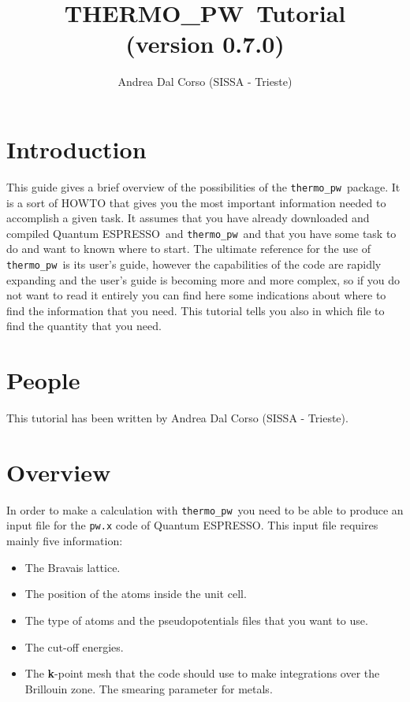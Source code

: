 \documentclass[12pt,a4paper]{article}
\def\version{0.7.0}
\def\qe{{\sc Quantum ESPRESSO}}
\def\tpw{{\sc THERMO\_PW}}
\def\thermo{\texttt{thermo\_pw}}
\begin{document}
 
\author{Andrea Dal Corso (SISSA - Trieste)}
\date{}


\title{
  \vskip 1cm
  {\color{red} \Huge \tpw\ Tutorial} \\
  \Large (version \version)
}

\maketitle

\tableofcontents

\newpage

\section{\color{coral}Introduction}

This guide gives a brief overview of the possibilities of the \thermo\ package. 
It is a sort of HOWTO that gives you the most important information needed 
to accomplish a given task.
It assumes that you have already downloaded and compiled \qe\ and \thermo\  
and that you have some task to do and want to known where to start. 
The ultimate reference for the use of \thermo\ is its user's guide,
however the capabilities of the code are rapidly expanding and the 
user's guide is becoming more and more complex, so if you do not want
to read it entirely you can find here some indications about where
to find the information that you need.
This tutorial tells you also in which file to find the quantity that you need.

\section{\color{coral}People}
This tutorial has been written by Andrea Dal Corso (SISSA - Trieste). 

\section{\color{coral}Overview}

In order to make a calculation with \thermo\ you need to be able to 
produce an input file for the \texttt{pw.x} code of \qe. This input file
requires mainly five information:
\begin{itemize}
\item The Bravais lattice.

\item The position of the atoms inside the unit cell.

\item The type of atoms and the pseudopotentials files that you want to use.

\item The cut-off energies.

\item The {\bf k}-point mesh that the code should use to make integrations over
the Brillouin zone. The smearing parameter for metals. 
\end{itemize}
\end{document}
